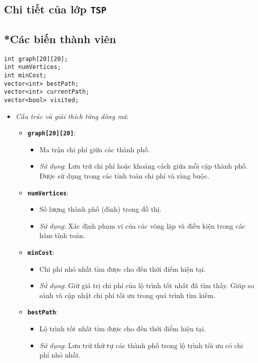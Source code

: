 \documentclass[a4paper]{article}
\begin{document}
\subsection*{Chi tiết của lớp \texttt{TSP}}\label{control}

\subsection*{*Các biến thành viên}
\begin{lstlisting}[style=cppstyle]
int graph[20][20];
int numVertices;
int minCost;
vector<int> bestPath;
vector<int> currentPath;
vector<bool> visited;
\end{lstlisting}

\begin{itemize}
\item \textit{Cấu trúc và giải thích từng dòng mã}:
\begin{itemize}
\item \textbf{\texttt{graph[20][20]}}:
\begin{itemize}
\item Ma trận chi phí giữa các thành phố.
\item \textit{Sử dụng}: Lưu trữ chi phí hoặc khoảng cách giữa mỗi cặp thành phố. Được sử dụng trong các tính toán chi phí và ràng buộc.
\end{itemize}
 \item \textbf{\texttt{numVertices}}: 
    \begin{itemize}
        \item Số lượng thành phố (đỉnh) trong đồ thị.
        \item \textit{Sử dụng}: Xác định phạm vi của các vòng lặp và điều kiện trong các hàm tính toán.
    \end{itemize}

    \item \textbf{\texttt{minCost}}: 
    \begin{itemize}
        \item Chi phí nhỏ nhất tìm được cho đến thời điểm hiện tại.
        \item \textit{Sử dụng}: Giữ giá trị chi phí của lộ trình tốt nhất đã tìm thấy. Giúp so sánh và cập nhật chi phí tối ưu trong quá trình tìm kiếm.
    \end{itemize}

    \item \textbf{\texttt{bestPath}}: 
    \begin{itemize}
        \item Lộ trình tốt nhất tìm được cho đến thời điểm hiện tại.
        \item \textit{Sử dụng}: Lưu trữ thứ tự các thành phố trong lộ trình tối ưu có chi phí nhỏ nhất.
    \end{itemize}


\end{itemize}
\end{itemize}
\end{document}
